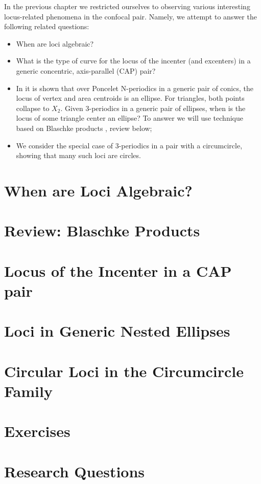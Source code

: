 In the previous chapter we restricted ourselves to observing various interesting locus-related phenomena in the confocal pair. 
Namely, we attempt to answer the following related questions:

\begin{itemize}
    \item When are loci algebraic?
    \item What is the type of curve for the locus of the incenter (and excenters) in a generic concentric, axis-parallel (CAP) pair?
    \item In \cite{sergei2016-com} it is shown that over Poncelet N-periodics in a generic pair of conics, the locus of vertex and area centroids is an ellipse. For triangles, both points collapse to $X_2$. Given 3-periodics in a generic pair of ellipses, when is the locus of some triangle center an ellipse? To answer we will use technique based on Blaschke products \cite{daepp-2019}, review below;
    \item We consider the special case of 3-periodics in a pair with a circumcircle, showing that many such loci are circles.
\end{itemize}

\section{When are Loci Algebraic?}
\label{sec:04-rational-trilinears}


\section{Review: Blaschke Products}
\label{sec:04-blaschke}


\section{Locus of the Incenter in a CAP pair}
\label{sec:04-proof_theorem}


\section{Loci in Generic Nested Ellipses}
\label{sec:04-loci}


\section{Circular Loci in the Circumcircle Family}
\label{sec:04-circular}


\section{Exercises}
\label{sec:04-exercises}


\section{Research Questions}
\label{sec:04-research}
